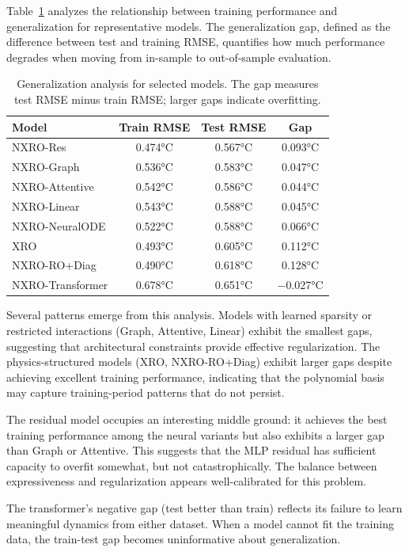 Table~\ref{tab:generalization} analyzes the relationship between training performance and generalization for representative models. The generalization gap, defined as the difference between test and training RMSE, quantifies how much performance degrades when moving from in-sample to out-of-sample evaluation.

\begin{table}[htbp]
\centering
\caption{Generalization analysis for selected models. The gap measures test RMSE minus train RMSE; larger gaps indicate overfitting.}
\label{tab:generalization}
\begin{tabular}{lccc}
\toprule
\textbf{Model} & \textbf{Train RMSE} & \textbf{Test RMSE} & \textbf{Gap} \\
\midrule
NXRO-Res & 0.474°C & 0.567°C & 0.093°C \\
NXRO-Graph & 0.536°C & 0.583°C & 0.047°C \\
NXRO-Attentive & 0.542°C & 0.586°C & 0.044°C \\
NXRO-Linear & 0.543°C & 0.588°C & 0.045°C \\
NXRO-NeuralODE & 0.522°C & 0.588°C & 0.066°C \\
XRO & 0.493°C & 0.605°C & 0.112°C \\
NXRO-RO+Diag & 0.490°C & 0.618°C & 0.128°C \\
NXRO-Transformer & 0.678°C & 0.651°C & $-$0.027°C \\
\bottomrule
\end{tabular}
\end{table}

Several patterns emerge from this analysis. Models with learned sparsity or restricted interactions (Graph, Attentive, Linear) exhibit the smallest gaps, suggesting that architectural constraints provide effective regularization. The physics-structured models (XRO, NXRO-RO+Diag) exhibit larger gaps despite achieving excellent training performance, indicating that the polynomial basis may capture training-period patterns that do not persist.

The residual model occupies an interesting middle ground: it achieves the best training performance among the neural variants but also exhibits a larger gap than Graph or Attentive. This suggests that the MLP residual has sufficient capacity to overfit somewhat, but not catastrophically. The balance between expressiveness and regularization appears well-calibrated for this problem.

The transformer's negative gap (test better than train) reflects its failure to learn meaningful dynamics from either dataset. When a model cannot fit the training data, the train-test gap becomes uninformative about generalization.

